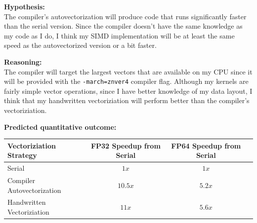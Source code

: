 \documentclass[11pt]{article}
\begin{document}
\begin{hypothesisbox}
	\textbf{Hypothesis:} \\

	The compiler's autovectorization will produce code that runs significantly faster than the serial version. Since the
	compiler doesn't have the same knowledge as my code as I do, I think my SIMD implementation will be at least the same
	speed as the autovectorized version or a bit faster.

	\textbf{Reasoning:} \\
	The compiler will target the largest vectors that are available on my CPU since it will be provided with the
	\texttt{-march=znver4} compiler flag. Although my kernels are fairly simple vector operations, since I have better
	knowledge of my data layout, I think that my handwritten vectoriziation will perform better than the compiler's
	vectoriziation.

	\textbf{Predicted quantitative outcome:} \\
	\begin{center}
		\label{tab:hypothesis-simd}
		\begin{tabular}{lccc}
			\toprule
			\textbf{Vectoriziation Strategy} & \textbf{FP32 Speedup from Serial} & \textbf{FP64 Speedup from Serial} \\
			\midrule
			Serial                           & $1x$                              & $1x$                              \\
			Compiler Autovectorization       & $10.5x$                           & $5.2x$                            \\
			Handwritten Vectoriziation       & $11x$                             & $5.6x$                            \\
			\bottomrule
		\end{tabular}
	\end{center}
\end{hypothesisbox}
\end{document}
